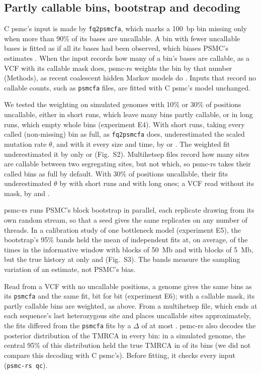 \documentclass[11pt]{article}
\newcommand{\psmcrs}{psmc-rs}
\newcommand{\opt}[1]{\texttt{#1}}
\begin{document}
\subsection*{Partly callable bins, bootstrap and decoding}

C psmc's input is made by \texttt{fq2psmcfa}, which marks a 100~bp bin missing only when more than 90\% of its bases are uncallable. A bin with fewer uncallable bases is fitted as if all its bases had been observed, which biases PSMC's estimates \citep{lipson2015,nadachowska2016}. When the input records how many of a bin's bases are callable, as a VCF with its callable mask does, \psmcrs{} weights the bin by that number (Methods), as recent coalescent hidden Markov models do \citep{cousins2024,cousins2025}. Inputs that record no callable counts, such as \texttt{psmcfa} files, are fitted with C psmc's model unchanged.

We tested the weighting on simulated genomes with 10\% or 30\% of positions uncallable, either in short runs, which leave many bins partly callable, or in long runs, which empty whole bins (experiment E4). With short runs, taking every called (non-missing) bin as full, as \texttt{fq2psmcfa} does, underestimated the scaled mutation rate $\theta$, and with it every size and time, by \EfourDispTenFqTheta{} or \EfourDispThirtyFqTheta{}. The weighted fit underestimated it by only \EfourDispTenAutoTheta{} or \EfourDispThirtyAutoTheta{} (Fig.~S2). Multihetsep files record how many sites are callable between two segregating sites, but not which, so \psmcrs{} takes their called bins as full by default. With 30\% of positions uncallable, their fits underestimated $\theta$ by \EfourDispThirtyMhsTheta{} with short runs and \EfourClusThirtyMhsTheta{} with long ones; a VCF read without its mask, by \EfourDispThirtyNomaskTheta{} and \EfourClusThirtyNomaskTheta{}.

\psmcrs{} runs PSMC's block bootstrap in parallel, each replicate drawing from its own random stream, so that a seed gives the same replicates on any number of threads. In a calibration study of one bottleneck model (experiment E5), the bootstrap's 95\% bands held the mean of independent fits at, on average, \EfiveFiftyCovMean{} of the times in the informative window with blocks of 50~Mb and \EfiveFiveCovMean{} with blocks of 5~Mb, but the true history at only \EfiveFiftyCov{} and \EfiveFiveCov{} (Fig.~S3). The bands measure the sampling variation of an estimate, not PSMC's bias.

Read from a VCF with no uncallable positions, a genome gives the same bins as its \texttt{psmcfa} and the same fit, bit for bit (experiment E6); with a callable mask, its partly callable bins are weighted, as above. From a multihetsep file, which ends at each sequence's last heterozygous site and places uncallable sites approximately, the fits differed from the \texttt{psmcfa} fits by a $\Delta$ of at most \EsixMhsRmseMax{}. \psmcrs{} also decodes the posterior distribution of the TMRCA in every bin: in a simulated genome, the central 95\% of this distribution held the true TMRCA in \EsixDecodeCov{} of its bins (we did not compare this decoding with C psmc's). Before fitting, it checks every input (\opt{psmc-rs qc}).
\end{document}

